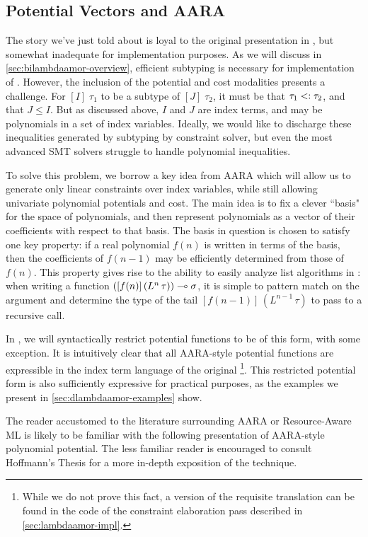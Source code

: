 \subsection{Potential Vectors and AARA}
The story we've just told about \lambdaamor is loyal to the original presentation in \citep{rajani-et-al:popl21}, but somewhat inadequate for implementation purposes. As we will discuss in \autoref{sec:bilambdaamor-overview}, efficient subtyping is necessary for implementation of \lambdaamor. However,
the inclusion of the potential and cost modalities presents a challenge. For $[I] \; \tau_1$ to be a subtype of $[J] \; \tau_2$, it must be that $\tau_1 <: \tau_2$, and that $J \leq I$. But as discussed above, $I$ and $J$ are index terms, and may be polynomials in a set of index variables. Ideally, we would like to discharge these inequalities generated by subtyping by constraint solver, but even the most advanced SMT solvers struggle to handle polynomial inequalities.

To solve this problem, we borrow a key idea from AARA \cite{hoffmann-et-al:esop10} which will allow us to generate only linear constraints over index variables, while still allowing univariate polynomial potentials and cost. The main idea is to fix a clever ``basis" for the space of polynomials, and then represent polynomials as a vector of their coefficients with respect to that basis. The basis in question is chosen to satisfy one key property: if a real polynomial $f(n)$ is written in terms of the basis, then the coefficients of $f(n-1)$ may be efficiently determined from those of $f(n)$. This property gives rise to the ability to easily analyze list algorithms in \lambdaamor: when writing a function $([f(n)] \, (L^n \, \tau)) \multimap \sigma$, it is simple to pattern match on the argument and determine the type of the tail $[f(n-1)] \, (L^{n-1} \, \tau)$ to pass to a recursive call.

In \dlambdaamor, we will syntactically restrict potential functions to be of this form, with some exception. It is intuitively clear that all AARA-style potential functions are expressible in the index term language of the original \lambdaamor\footnote{
While we do not prove this fact, a version of the requisite translation can be found in the code of the constraint elaboration pass described in \autoref{sec:lambdaamor-impl}.
}. This restricted potential form is also sufficiently expressive for practical purposes, as the examples we present in \autoref{sec:dlambdaamor-examples} show.

The reader accustomed to the literature surrounding AARA or Resource-Aware ML is likely to be familiar with the following presentation of AARA-style polynomial potential. The less familiar reader is encouraged to consult Hoffmann's Thesis \cite{hoffmann:thesis} for a more in-depth exposition of the technique.

